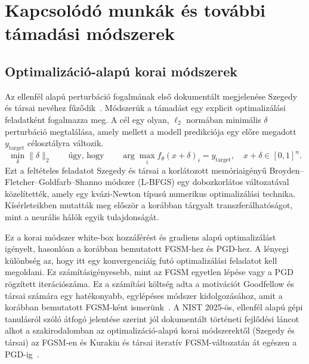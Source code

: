 \section{Kapcsolódó munkák és további támadási módszerek}

\subsection{Optimalizáció-alapú korai módszerek}
Az ellenfél alapú perturbáció fogalmának első dokumentált megjelenése Szegedy és társai nevéhez 
fűződik~\cite{szegedy2014intriguing}. 
Módszerük a támadást egy explicit optimalizálási feladatként fogalmazza meg. 
A cél egy olyan, $\ell_2$ normában minimális $\delta$ perturbáció megtalálása, amely mellett a modell predikciója egy előre 
megadott $y_{\mathrm{target}}$ célosztályra változik. 
\[
  \min_{\delta} \|\delta\|_2 \qquad \text{úgy, hogy} \qquad \arg\max_i f_\theta(x+\delta)_i = y_{\mathrm{target}},
  \quad x+\delta \in [0,1]^n.
\]
Ezt a feltételes feladatot Szegedy és társai a korlátozott memóriaigényű Broyden--Fletcher--Goldfarb--Shanno módszer (L-BFGS) 
egy dobozkorlátos változatával közelítették, amely egy kvázi-Newton típusú numerikus optimalizálási technika. 
Kísérleteikben mutatták meg először a korábban tárgyalt transzferálhatóságot, mint a neurális hálók egyik tulajdonságát. 

Ez a korai módszer white-box hozzáférést és gradiens alapú optimalizálást igényelt, hasonlóan a korábban bemutatott FGSM-hez és 
PGD-hez. 
A lényegi különbség az, hogy itt egy konvergenciáig futó optimalizálási feladatot kell megoldani. 
Ez számításigényesebb, mint az FGSM egyetlen lépése vagy a PGD rögzített iterációszáma. 
Ez a számítási költség adta a motivációt Goodfellow és társai számára egy hatékonyabb, egylépéses módszer kidolgozásához, amit a 
korábban bemutatott FGSM-ként ismerünk~\cite{goodfellow2015explaining}. 
A NIST 2025-ös, ellenfél alapú gépi tanulásról szóló átfogó jelentése szerint jól dokumentált történeti fejlődési láncot alkot a 
szakirodalomban az optimalizáció-alapú korai módszerektől (Szegedy és társai) az FGSM-en és Kurakin és társai iteratív 
FGSM-változatán át egészen a PGD-ig~\cite{nist2025aml}. 


